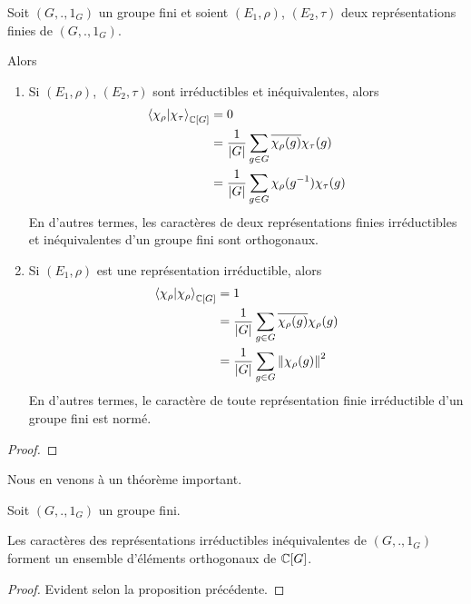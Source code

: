 \begin{proposition}
	Soit $(G, ., 1_{G})$ un groupe fini et soient $(E_{1}, \rho)$,
	$(E_{2}, \tau)$
	deux représentations finies de $(G, ., 1_{G})$.

	Alors
	\begin{enumerate}
		\item Si $(E_{1}, \rho)$,
		$(E_{2}, \tau)$ sont irréductibles
		et inéquivalentes, alors
		\begin{align}
			\bra{\chi_{\rho}}\ket{\chi_{\tau}}_{\mathbb{C}[G]} & = 0 \\
			& = \frac{1}{|G|} \sum_{g \in G}
			\overline{\chi_{\rho}(g)} \chi_{\tau}(g) \\
			& = \frac{1}{|G|} \sum_{g \in G}
			\chi_{\rho}(g^{-1}) \chi_{\tau}(g)
		\end{align}
		En d'autres termes, les caractères de deux représentations finies irréductibles et
		inéquivalentes d'un groupe fini sont orthogonaux.

		\item Si $(E_{1}, \rho)$ est une
			représentation irréductible, alors
			\begin{align}
				\bra{\chi_{\rho}}\ket{\chi_{\rho}}_{\mathbb{C}[G]} & = 1 \\
				& = \frac{1}{|G|} \sum_{g \in G}
				\overline{\chi_{\rho}(g)} \chi_{\rho}(g) \\
				& = \frac{1}{|G|} \sum_{g \in G}
				\norm{\chi_{\rho}(g)}^{2}
			\end{align}
			En d'autres termes, le caractère de toute représentation finie irréductible d'un
			groupe fini est normé.
	\end{enumerate}
\end{proposition}

\ifdefined\outputproof
\begin{proof}

\end{proof}
\fi

Nous en venons à un théorème important.

\begin{theorem}
	\label{thm:uir_set_orthonormal}
	Soit $(G, ., 1_{G})$ un groupe fini.

	Les caractères des représentations irréductibles inéquivalentes de
	$(G, ., 1_{G})$ forment un ensemble d'éléments orthogonaux de $\mathbb{C}[G]$.
\end{theorem}

\ifdefined\outputproof
\begin{proof}
	Evident selon la proposition précédente.
\end{proof}
\fi


